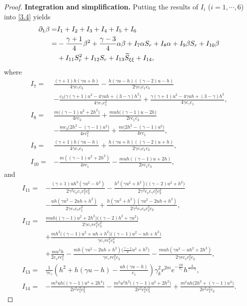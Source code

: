 \documentclass[11pt,reqno]{article}
\numberwithin{equation}{section}
\begin{document}
\begin{proof}
\noindent\textbf{Integration and simplification.} Putting the results of $I_i$ ($i=1,\cdots,6$) into \eqref{3.4} yields
\begin{align}\label{3.5}
\partial_1\beta=&I_1+I_2+I_3+I_4+I_5+I_6 \notag \\
=& -\frac{\gamma+1}{4}\beta^{2}
+ \frac{\gamma-3}{4}\alpha\beta +I_{7}\alpha S_{r}+I_{8}\alpha +I_{9}\beta S_{r} +I_{10}\beta \notag \\
&+I_{11} S_{r}^{2} +I_{12}S_r +I_{13} \widetilde{S}_{\xi\xi} +I_{14},
\end{align}
where
\begin{align*}
I_{7}=&\frac{(\gamma+1)h(\gamma u+h)}{4\gamma c_\gamma c_3}
   - \frac{h(\gamma u-h)((\gamma-2)u-h)}{2\gamma c_\gamma c_1 c_3} \\
&- \frac{c_3\big(\gamma(\gamma+1)u^{2}-4\gamma uh+(3-\gamma)h^{2}\big)}{4\gamma c_\gamma c_1^{2}} + \frac{\gamma(\gamma+1)u^{2}-4\gamma uh+(3-\gamma)h^{2}}{4\gamma c_\gamma c_1}, \\
I_{8}=&\frac{m\big((\gamma-1)u^{2}+2h^{2}\big)}{4r c_3}
   + \frac{muh\big((\gamma-1)u-2h\big)}{2r c_1 c_3} \\
&- \frac{mc_3\big(2h^{2}-(\gamma-1)u^{2}\big)}{4r c_1^{2}}  + \frac{m\big(2h^{2}-(\gamma-1)u^{2}\big)}{4r c_1}, \\
I_{9}=&\frac{(\gamma+1)h(\gamma u-h)}{4\gamma c_\gamma c_1}
   + \frac{h(\gamma u+h)((\gamma-2)u+h)}{2\gamma c_\gamma c_1 c_3}, \\
I_{10}=&- \frac{m\left((\gamma-1)u^2 + 2h^2\right)}{4r c_1}
-\frac{muh\left((\gamma-1)u + 2h\right)}{2r c_1 c_3},
\end{align*}
and
\begin{align*}
I_{11}=&-\frac{(\gamma+1)uh^{3}(\gamma u^{2}-h^{2})}{2\gamma^{2} c_v c_\gamma c_1^{2} c_3^{2}}
   - \frac{h^{2}(\gamma u^{2}+h^{2})\big((\gamma-2)u^{2}+h^{2}\big)}{2\gamma^{2} c_v c_\gamma c_1^{2} c_3^{2}} \\
& - \frac{uh(\gamma u^{2}-2uh+h^{2})}{2\gamma c_\gamma c_v c_1^{2}}
   + \frac{h(\gamma u^{2}+h^{2})(\gamma u^{2}-2uh+h^{2})}{2\gamma^{2} c_\gamma c_v c_1^{2} c_3}, \\
I_{12}=&\frac{muh\big((\gamma-1)u^{2}+2h^{2}\big)\big((\gamma-2)h^{2}+\gamma u^{2}\big)}{2\gamma c_\gamma r c_1^{2} c_3^{2}}  \\
&+ \frac{mh^{2}\big((\gamma-1)u^{2}+uh+h^{2}\big)\big((\gamma-1)u^{2}-uh+h^{2}\big)}{\gamma c_\gamma r c_1^{2} c_3^{2}} \\
&  + \frac{mu^{3}h}{2c_v r c_1^{2}}
   - \frac{mh(\gamma u^{2}-2uh+h^{2})\big(\frac{\gamma-1}{2}u^{2}+h^{2}\big)}{\gamma c_\gamma r c_1^{2} c_3}
   - \frac{muh(\gamma u^{3}-uh^{2}+2h^{3})}{2\gamma r c_v c_1^{2} c_3}, \\
I_{13}=&\frac{1}{\gamma c_{\gamma}}
\left( h^2 + h(\gamma u - h) - \frac{uh(\gamma u-h)}{c_1} \right)\gamma_k^2 r^{2m} e^{-\frac{2S}{c_\gamma}} h^{\frac{4}{\gamma-1}}, \\
I_{14}=&-\frac{m^{2}uh\big((\gamma-1)u^{4}+2h^{4}\big)}{2r^{2} c_1^{2} c_3^{2}}
   - \frac{m^{2}u^{2}h^{2}\big((\gamma-1)u^{2}+2h^{2}\big)}{2r^{2} c_1^{2} c_3^{2}} + \frac{m^{2}uh\big(2h^{3}+(\gamma-1)u^{3}\big)}{2r^{2} c_1^{2} c_3}.
\end{align*}


\end{proof}
\end{document}
